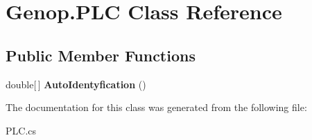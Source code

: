 \hypertarget{classGenop_1_1PLC}{}\section{Genop.\+P\+LC Class Reference}
\label{classGenop_1_1PLC}
\subsection*{Public Member Functions}
\begin{DoxyCompactItemize}
\item 
double\mbox{[}$\,$\mbox{]} {\bfseries Auto\+Identyfication} ()\hypertarget{classGenop_1_1PLC_afa849d2eba7ea7ba9f2c36364e069c45}{}\label{classGenop_1_1PLC_afa849d2eba7ea7ba9f2c36364e069c45}

\end{DoxyCompactItemize}


The documentation for this class was generated from the following file\+:\begin{DoxyCompactItemize}
\item 
P\+L\+C.\+cs\end{DoxyCompactItemize}

